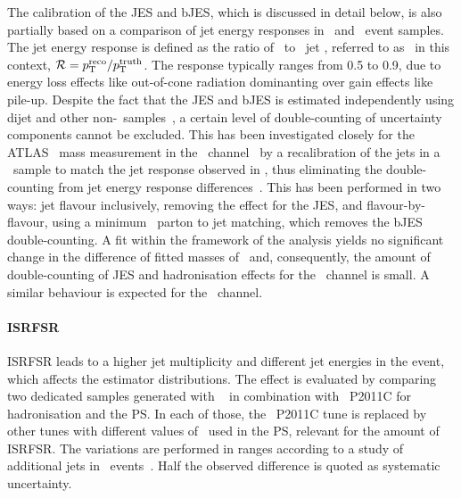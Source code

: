 The calibration of the \gls{JES} and \gls{bJES}, which is discussed in detail below, is also partially based on a comparison of jet energy responses in \Herwigpp\ and \Pythia\ event samples.
%
The jet energy response is defined as the ratio of \recolevel\ to \stablevel\ jet \pt, referred to as \truelevel\ in this context, $\mathcal R=p_\mathrm{T}^\mathrm{reco}/p_\mathrm{T}^\mathrm{truth}$. The response typically ranges from 0.5 to 0.9, due to energy loss effects like out-of-cone radiation dominanting over gain effects like pile-up.
%
Despite the fact that the \gls{JES} and \gls{bJES} is estimated independently using dijet and other non-\ttbar\ samples~\cite{ATLASCollaboration2015b}, a certain level of double-counting of uncertainty components cannot be excluded. 
%
This has been investigated closely for the \gls{ATLAS} \tquark\ mass measurement in the \ljets\ channel~\cite{Aad:2015nba} by a recalibration of the jets in a \Pythia\ sample to match the jet response observed in \Herwig, thus eliminating the double-counting from jet energy response differences~\cite{ATL-PHYS-PUB-2015-042}. 
%
This has been performed in two ways: jet flavour inclusively, removing the effect for the \gls{JES}, and flavour-by-flavour, using a minimum \dR\ parton to jet matching, which removes the \gls{bJES} double-counting.
%
A fit within the framework of the analysis yields no significant change in the difference of fitted masses of \PowhegPythia\ and, consequently, the amount of double-counting of \gls{JES} and hadronisation effects for the \ljets\ channel is small. 
%
A similar behaviour is expected for the \dil\ channel.
%
%
\paragraph{\gls{ISRFSR}}\mbox{}
%
\gls{ISRFSR} leads to a higher jet multiplicity and different jet energies in the event, which affects the estimator distributions. 
%
The effect is evaluated by comparing two dedicated samples generated with \Acermc~\cite{SAMPLES-ACER} in combination with \Pythia\ P2011C for hadronisation and the \gls{PS}. 
%
In each of those, the \Pythia\ P2011C tune is replaced by other tunes with different values of \alphas\ used in the \gls{PS}, relevant for the amount of \gls{ISRFSR}. The variations are performed in ranges according to a study of additional jets in \ttbar\ events~\cite{ATL-2012-033}. 
%
Half the observed difference is quoted as systematic uncertainty.
%
%
